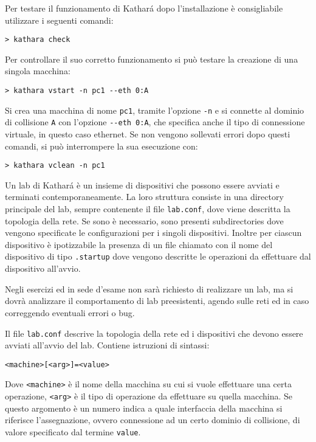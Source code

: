 \documentclass{article}
\numberwithin{equation}{subsection}
\begin{document}
Per testare il funzionamento di Kathar\'{a} dopo l'installazione è consigliabile utilizzare i seguenti comandi:
\begin{verbatim}
> kathara check 
\end{verbatim}                                                                                                                                                                                 
Per controllare il suo corretto funzionamento si può testare la creazione di una singola macchina:
\begin{verbatim}
> kathara vstart -n pc1 --eth 0:A
\end{verbatim}
Si crea una macchina di nome \verb|pc1|, tramite l'opzione \verb|-n| e si connette al dominio di collisione \verb|A| con l'opzione \verb|--eth 0:A|, che specifica anche il tipo di connessione virtuale, in questo 
caso ethernet. Se non vengono sollevati errori dopo questi comandi, si può interrompere la sua esecuzione con:
\begin{verbatim}
> kathara vclean -n pc1
\end{verbatim}


Un lab di Kathar\'{a} è un insieme di dispositivi che possono essere avviati e terminati contemporaneamente. La loro struttura consiste in una directory principale del lab, sempre contenente il file \verb|lab.conf|, 
dove viene descritta la topologia della rete. Se sono è necessario, sono presenti subdirectories dove vengono specificate le configurazioni per i singoli dispositivi. Inoltre per ciascun dispositivo è 
ipotizzabile la presenza di un file chiamato con il nome del dispositivo di tipo \verb|.startup| dove vengono descritte le operazioni da effettuare dal dispositivo all'avvio. 

Negli esercizi ed in sede d'esame non sarà richiesto di realizzare un lab, ma si dovrà analizzare il comportamento di lab preesistenti, agendo sulle reti ed in caso correggendo eventuali errori o bug. 


Il file \verb|lab.conf| descrive la topologia della rete ed i dispositivi che devono essere avviati all'avvio del lab. Contiene istruzioni di sintassi:
\begin{verbatim}
<machine>[<arg>]=<value>
\end{verbatim}
Dove \verb|<machine>| è il nome della macchina su cui si vuole effettuare una certa operazione, \verb|<arg>| è il tipo di operazione da effettuare su quella macchina. Se questo argomento è un numero indica a quale 
interfaccia della macchina si riferisce l'assegnazione, ovvero connessione ad un certo dominio di collisione, di valore specificato dal termine \verb|value|. 
\end{document}
